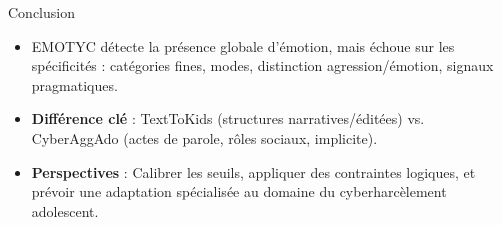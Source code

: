 \documentclass{beamer}
\begin{document}
\begin{frame}{Conclusion}
    \begin{itemize}
        \item EMOTYC détecte la présence globale d'émotion, mais échoue sur les spécificités : catégories fines, modes, distinction agression/émotion, signaux pragmatiques.
        \item \textbf{Différence clé} : TextToKids (structures narratives/éditées) vs. CyberAggAdo (actes de parole, rôles sociaux, implicite).
        \item \textbf{Perspectives} : Calibrer les seuils, appliquer des contraintes logiques, et prévoir une adaptation spécialisée au domaine du cyberharcèlement adolescent.
    \end{itemize}
\end{frame}
\end{document}
